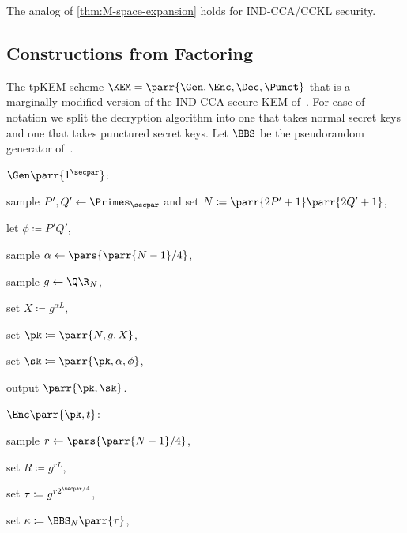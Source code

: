 \begin{corollary}
    The analog of \cref{thm:M-space-expansion} holds for IND-CCA/CCKL security.
\end{corollary}


\subsection{Constructions from Factoring}

\begin{construction}\label{con:HK09-KEM}
    The tpKEM scheme \(\KEM = \parr{\Gen,\Enc,\Dec,\Punct}\) that is a marginally modified version of the IND-CCA secure KEM of~\textcite{EC:HofKil09}.
    For ease of notation we split the decryption algorithm into one that takes normal secret keys and one that takes punctured secret keys.
    Let \(\BBS\) be the pseudorandom generator of~\textcite{C:BluBluShu82}.
    \begin{sitemize}
        \item \(\Gen\parr{1^\secpar}\):
        \begin{sitemize}
            \item sample \(P',Q' \gets \Primes_\secpar\) and set \(N \coloneqq \parr{2P'+1} \parr{2Q'+1}\),
            \item let \(\phi \coloneqq P'Q'\),
            \item sample \(\alpha \gets \pars{\parr{N-1}/4}\),
            \item sample \(g \gets \Q\R_N\),
            \item set \(X \coloneqq g^{\alpha L}\),
            \item set \(\pk \coloneqq \parr{N,g,X}\),
            \item set \(\sk \coloneqq \parr{\pk,\alpha,\phi}\),
            \item output \(\parr{\pk,\sk}\).
        \end{sitemize}
        \item \(\Enc\parr{\pk,t}\):
        \begin{sitemize}
            \item sample \(r \gets \pars{\parr{N-1}/4}\),
            \item set \(R \coloneqq g^{r L}\),
            \item set \(\tau \coloneqq g^{r 2^{\secpar/4}}\),
            \item set \(\kappa \coloneqq \BBS_N\parr{\tau}\),

\end{sitemize}
\end{sitemize}
\end{construction}
